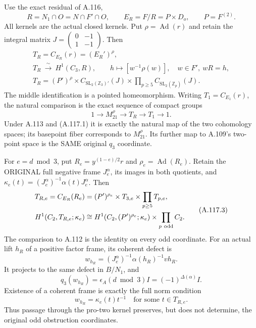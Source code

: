 Use the exact residual of A.116,
\[
 R=N_1\cap O=N\cap F'\cap O,\qquad
 E_R=F/R=P\times D_o,\qquad P=F^{(2)}.
\]
All kernels are the actual closed kernels. Put
\(\rho=\operatorname{Ad}(r)\) and retain the integral matrix
\(J=\left(\begin{smallmatrix}0&-1\\1&-1\end{smallmatrix}\right)\).
Then
\[
 \begin{gathered}
 T_R=C_{E_R}(r)=(E_R')^\rho,\\
 T_R\ \xrightarrow{\ \sim\ }\ H^1(C_3,R),\qquad
 h\longmapsto[w^{-1}\rho(w)],\quad w\in F',\ wR=h,\\
 T_R=(P')^\rho\times C_{\mathrm{SL}_2(\mathbb Z_3)'}(J)
       \times\prod_{p\geq5}C_{\mathrm{SL}_2(\mathbb Z_p)}(J).
 \end{gathered}
 \tag{A.117.1}
\]
The middle identification is a pointed homeomorphism.
Writing \(T_1=C_{E_1}(r)\), the natural comparison is the exact
sequence of compact groups
\[
 1\longrightarrow M_{21}^\rho\longrightarrow T_R
                 \longrightarrow T_1\longrightarrow1.
 \tag{A.117.2}
\]
Under A.113 and (A.117.1) it is exactly the natural map of the
two cohomology spaces; its basepoint fiber corresponds to
\(M_{21}^\rho\). Its further map to A.109's two-point space
is the SAME original \(q_3\) coordinate.

For \(e=d\bmod3\), put \(R_e=y^{(1-e)/2}r\) and
\(\rho_e=\operatorname{Ad}(R_e)\). Retain the ORIGINAL full
negative frame \(J_e^\alpha\), its images in both quotients,
and \(\kappa_e(t)=(J_e^\alpha)^{-1}\alpha(t)J_e^\alpha\).
Then
\[
 \begin{split}
 T_{R,e}=C_{E_R}(R_e)
   &=(P')^{\rho_e}\times T_{3,e}\times\prod_{p\geq5}T_{p,e},\\
 H^1(C_2,T_{R,e};\kappa_e)
   &\cong H^1(C_2,(P')^{\rho_e};\kappa_e)
                   \times\prod_{p\ {\rm odd}}C_2.
 \end{split}
 \tag{A.117.3}
\]
The comparison to A.112 is the identity on every odd coordinate.
For an actual lift \(h_R\) of a positive factor frame, its coherent
defect is
\[
 w_{h_R}=(J_e^\alpha)^{-1}\alpha(h_R)^{-1}vh_R.
 \tag{A.117.4}
\]
It projects to the same defect in \(B/N_1\), and
\[
 q_3(w_{h_R})=\epsilon_A(d\bmod3)I=(-1)^{\Delta(\alpha)}I.
 \tag{A.117.5}
\]
Existence of a coherent frame is exactly the full norm condition
\[
       w_{h_R}=\kappa_e(t)t^{-1}\quad\text{for some }t\in T_{R,e}.
 \tag{A.117.6}
\]
Thus passage through the pro-two kernel preserves, but does not
determine, the original odd obstruction coordinates.


